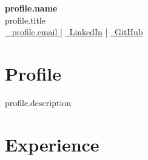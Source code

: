 \documentclass[11pt]{article}
\begin{document}
\begin{center}
    {\LARGE \textbf{{{ profile.name }}}} \\
    \vspace{2mm}
    {{ profile.title }} \\
    \vspace{2mm}
    \href{mailto:{{ profile.email }}}{\faEnvelope\ {{ profile.email }}} |
    \href{https://{{ profile.linkedin }}}{\faLinkedin\ LinkedIn} |
    \href{https://{{ profile.github }}}{\faGithub\ GitHub}
\end{center}

\section*{Profile}
{{ profile.description }}

\section*{Experience}
\end{document}
